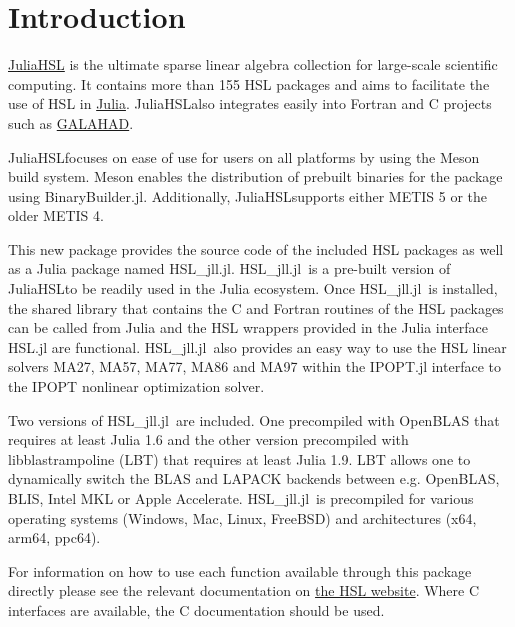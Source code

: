 \documentclass[gdweb]{geradwp}
\newcommand{\JuliaHSL}{JuliaHSL}  %
\newcommand{\HSLjll}{HSL\_jll.jl}
\begin{document}

\GDarticlestart

\section{Introduction}

\href{https://licences.stfc.ac.uk/product/julia-hsl}{\JuliaHSL} is the ultimate sparse linear algebra collection for large-scale scientific computing.
It contains more than 155 HSL packages and aims to facilitate the use of HSL in \href{https://julialang.org/}{Julia}.
\JuliaHSL also integrates easily into Fortran and C projects such as \href{https://github.com/ralna/GALAHAD}{GALAHAD}.

\JuliaHSL focuses on ease of use for users on all platforms by using the Meson build system.
Meson enables the distribution of prebuilt binaries for the package using BinaryBuilder.jl.
Additionally, \JuliaHSL supports either METIS 5 or the older METIS 4.

This new package provides the source code of the included HSL packages as well as a Julia package named \HSLjll.
\HSLjll~is a pre-built version of \JuliaHSL to be readily used in the Julia ecosystem.
Once \HSLjll~is installed, the shared library that contains the C and Fortran routines of the HSL packages can be called from Julia and the HSL wrappers provided in the Julia interface HSL.jl are functional.
\HSLjll~also provides an easy way to use the HSL linear solvers MA27, MA57, MA77, MA86 and MA97 within the IPOPT.jl interface to the IPOPT nonlinear optimization solver.

Two versions of \HSLjll~are included. One precompiled with OpenBLAS that requires at least Julia 1.6 and the other version precompiled with libblastrampoline (LBT) that requires at least Julia 1.9.
LBT allows one to dynamically switch the BLAS and LAPACK backends between e.g. OpenBLAS, BLIS, Intel MKL or Apple Accelerate.
\HSLjll~is precompiled for various operating systems (Windows, Mac, Linux, FreeBSD) and architectures (x64, arm64, ppc64).

For information on how to use each function available through this package directly please see the relevant documentation on \href{https://www.hsl.rl.ac.uk/catalogue/}{the HSL website}.
Where C interfaces are available, the C documentation should be used.
\end{document}
